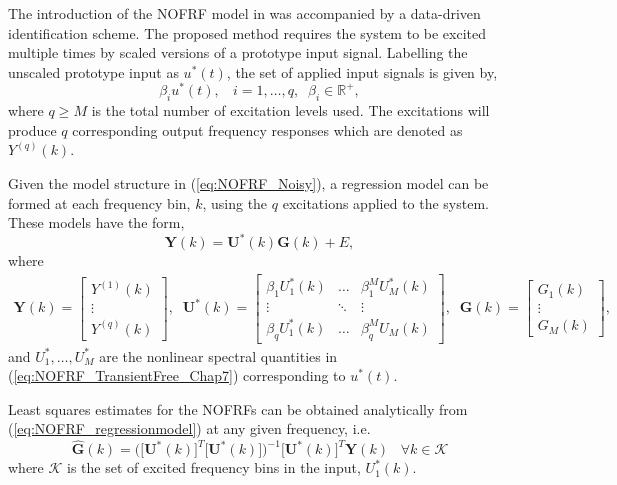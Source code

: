 The introduction of the NOFRF model in \cite{Lang2005} was accompanied by a data-driven identification scheme. The proposed method requires the system to be excited multiple times by scaled versions of a prototype input signal. Labelling the unscaled prototype input as $u^*(t)$, the set of applied input signals is given by,
$$\beta_i u^*(t), \ \ \ \ i = 1, \hdots, q, \; \; \beta_i \in \mathbb{R}^+,$$
where $q \geq M$ is the total number of excitation levels used. The excitations will produce $q$ corresponding output frequency responses which are denoted as $Y^{(q)}(k)$.

Given the model structure in (\ref{eq:NOFRF_Noisy}), a regression model can be formed at each frequency bin, $k$, using the $q$ excitations applied to the system. These models have the form,
\begin{equation}
\mathbf{Y}(k) = \mathbf{U^*}(k) \mathbf{G}(k) + E,
\label{eq:NOFRF_regressionmodel}
\end{equation}
where
\begin{align}
\mathbf{Y}(k) = \begin{bmatrix} Y^{(1)}(k) \\ \vdots \\ Y^{(q)}(k)\end{bmatrix}, \; \; \mathbf{U^*}(k) = \begin{bmatrix} \beta_1 U^*_1(k) & \hdots & \beta_1^M U^*_M(k) \\ \vdots &\ddots & \vdots \\ \beta_q U^*_1(k) & \hdots & \beta_q^M U_M(k) \end{bmatrix}, \; \; \mathbf{G}(k) = \begin{bmatrix} G_1(k) \\ \vdots \\ G_M(k)\end{bmatrix},
\end{align} 
and $U^*_1,\hdots,U^*_M$ are the nonlinear spectral quantities in (\ref{eq:NOFRF_TransientFree_Chap7}) corresponding to $u^*(t)$. 

Least squares estimates for the NOFRFs can be obtained analytically from (\ref{eq:NOFRF_regressionmodel}) at any given frequency, i.e.
\begin{equation}
\hat{\mathbf{G}}(k) = \bigg( \big[ \mathbf{U^*}(k) \big]^T \big[ \mathbf{U^*}(k) \big] \bigg)^{-1} \big[ \mathbf{U^*}(k) \big]^T \mathbf{Y}(k) \; \; \; \forall k \in \mathcal{K}
\end{equation}
where $\mathcal{K}$ is the set of excited frequency bins in the input, $U^*_1(k)$.


